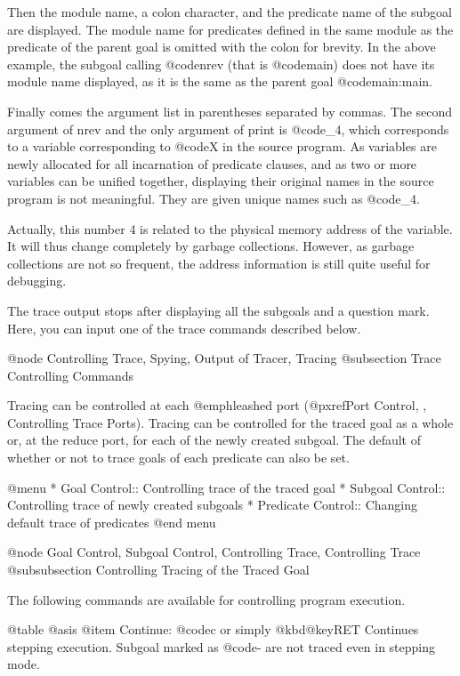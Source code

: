 {{{{Then the module name, a colon character, and the predicate name of the
subgoal are displayed.  The module name for predicates defined in the
same module as the predicate of the parent goal is omitted with the
colon for brevity.  In the above example, the subgoal calling
@code{nrev} (that is @code{main}) does not have its module name
displayed, as it is the same as the parent goal @code{main:main}.

Finally comes the argument list in parentheses separated by commas.  The
second argument of nrev and the only argument of print is @code{_4},
which corresponds to a variable corresponding to @code{X} in the source
program.  As variables are newly allocated for all incarnation of
predicate clauses, and as two or more variables can be unified together,
displaying their original names in the source program is not meaningful.
They are given unique names such as @code{_4}.

Actually, this number 4 is related to the physical memory address of the
variable.  It will thus change completely by garbage collections.
However, as garbage collections are not so frequent, the address
information is still quite useful for debugging.

The trace output stops after displaying all the subgoals and a question
mark.  Here, you can input one of the trace commands described below.

@node Controlling Trace, Spying, Output of Tracer, Tracing
@subsection Trace Controlling Commands

Tracing can be controlled at each @emph{leashed} port (@pxref{Port
Control, , Controlling Trace Ports}).  Tracing can be controlled for the
traced goal as a whole or, at the reduce port, for each of the newly
created subgoal.  The default of whether or not to trace goals of each
predicate can also be set.

@menu
* Goal Control::                Controlling trace of the traced goal
* Subgoal Control::             Controlling trace of newly created subgoals
* Predicate Control::           Changing default trace of predicates
@end menu

@node Goal Control, Subgoal Control, Controlling Trace, Controlling Trace
@subsubsection Controlling Tracing of the Traced Goal

The following commands are available for controlling program execution.

@table @asis
@item Continue: @code{c} or simply @kbd{@key{RET}}
Continues stepping execution.  Subgoal marked as @code{-} are not
traced even in stepping mode.

}}}}

